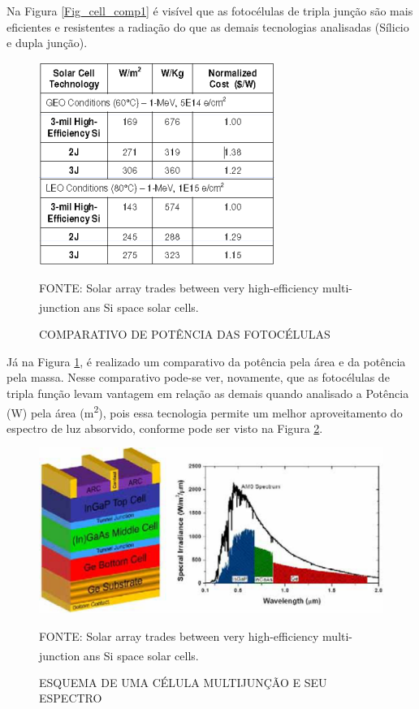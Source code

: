 \documentclass[
	12pt,				%
	openright,			%
	oneside,			%
	a4paper,			%
	english,			%
	french,				%
	spanish,			%
	brazil,				%
	oldfontcommands
	]{abntex2}
\begin{document}
	Na Figura \ref{Fig_cell_comp1} é visível que as fotocélulas de tripla junção são mais eficientes e resistentes a radiação do que as demais tecnologias analisadas (Sílicio e dupla junção).
	
	\begin{figure}[th]
		\caption{COMPARATIVO DE POTÊNCIA DAS FOTOCÉLULAS}
		\label{Fig_cell_comp2}
		\centering
		\includegraphics[width=0.6\linewidth]{./figs/cell_comp2}
			
		\begin{small}
			FONTE: Solar array trades between very high-efficiency multi-junction ans Si space solar cells.\textsuperscript{\cite{Fatemi}}
		\end{small}		
	\end{figure}	
	\pagebreak
	Já na Figura \ref{Fig_cell_comp2}, é realizado um comparativo da potência pela área e da potência pela massa. Nesse comparativo pode-se ver, novamente, que as fotocélulas de tripla função levam vantagem em relação as demais quando analisado a Potência (W) pela área (m\textsuperscript{2}), pois essa tecnologia permite um melhor aproveitamento do espectro de luz absorvido, conforme pode ser visto na Figura \ref{Fig_cell_mult}. 
	
	\begin{figure}[th]
		\caption{ESQUEMA DE UMA CÉLULA MULTIJUNÇÃO E SEU ESPECTRO}
		\label{Fig_cell_mult}
		\centering
		\includegraphics[width=1.05\linewidth]{./figs/cell_mult}
			
		\begin{small}
			FONTE: Solar array trades between very high-efficiency multi-junction ans Si space solar cells.\textsuperscript{\cite{Fatemi}}
		\end{small}		
	\end{figure}	
	
\end{document}
